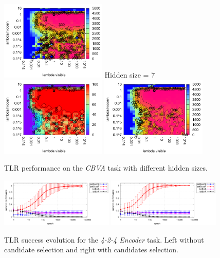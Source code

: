\begin{figure}[H]
  \includegraphics[width=0.45\textwidth]{img/k3/tlr-5-epoch.pdf}  
  Hidden size = 7 \\
  \includegraphics[width=0.45\textwidth]{img/k3/tlr-7-success.pdf} 
  \includegraphics[width=0.45\textwidth]{img/k3/tlr-7-epoch.pdf}    
  \caption{TLR performance on the \emph{CBVA} task with different hidden sizes.}
  \label{fig:results-tlr-k3-success}
\end{figure}

\begin{figure}[H]
  \centering
  \includegraphics[width=0.48\textwidth]{img/tlr-k3-3-best-perf.pdf}   
  \includegraphics[width=0.48\textwidth]{img/tlr-k3-3-best-can.pdf}      
  \caption{TLR success evolution for the \emph{4-2-4 Encoder} task. Left without candidate selection and right with candidates selection. }
  \label{fig:results-tlr-k3-epoch} 
\end{figure}

